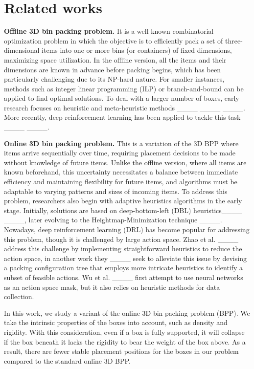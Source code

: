 \section{Related works}
\label{section:related works}

\textbf{Offline 3D bin packing problem. }It is a well-known combinatorial optimization problem in which the objective is to efficiently pack a set of three-dimensional items into one or more bins (or containers) of fixed dimensions, maximizing space utilization. In the offline version, all the items and their dimensions are known in advance before packing begins, which has been particularly challenging due to its NP-hard nature. For smaller instances, methods such as integer linear programming (ILP) or branch-and-bound can be applied to find optimal solutions. To deal with a larger number of boxes, early research focuses on heuristic and meta-heuristic methods ____ ____ ____. More recently, deep reinforcement learning has been applied to tackle this task ____ ____.

\textbf{Online 3D bin packing problem. }This is a variation of the 3D BPP where items arrive sequentially over time, requiring placement decisions to be made without knowledge of future items. Unlike the offline version, where all items are known beforehand, this uncertainty necessitates a balance between immediate efficiency and maintaining flexibility for future items, and algorithms must be adaptable to varying patterns and sizes of incoming items. To address this problem, researchers also begin with adaptive heuristics algorithms in the early stage. Initially, solutions are based on deep-bottom-left (DBL) heuristics____ ____, later evolving to the Heightmap-Minimization technique ____. Nowadays, deep reinforcement learning (DRL) has become popular for addressing this problem, though it is challenged by large action space. Zhao et al. ____ address this challenge by implementing straightforward heuristics to reduce the action space, in another work they ____ seek to alleviate this issue by devising a packing configuration tree that employs more intricate heuristics to identify a subset of feasible actions. Wu et al. ____ first attempt to use neural networks as an action space mask, but it also relies on heuristic methods for data collection. 

In this work, we study a variant of the online 3D bin packing problem (BPP). We take the intrinsic properties of the boxes into account, such as density and rigidity. With this consideration, even if a box is fully supported, it will collapse if the box beneath it lacks the rigidity to bear the weight of the box above. As a result, there are fewer stable placement positions for the boxes in our problem compared to the standard online 3D BPP.


